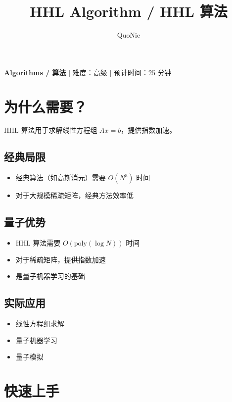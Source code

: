 \documentclass[12pt,a4paper]{article}
\title{HHL Algorithm / HHL 算法}
\author{QuoNic}
\date{}
\begin{document}
\maketitle

\begin{center}
\textbf{Algorithms / 算法} | 难度：高级 | 预计时间：25 分钟
\end{center}

\tableofcontents
\newpage

\section{为什么需要？}

HHL 算法用于求解线性方程组 $Ax=b$，提供指数加速。

\subsection{经典局限}
\begin{itemize}
  \item 经典算法（如高斯消元）需要 $O(N^3)$ 时间
  \item 对于大规模稀疏矩阵，经典方法效率低
\end{itemize}

\subsection{量子优势}
\begin{itemize}
  \item HHL 算法需要 $O(\text{poly}(\log N))$ 时间
  \item 对于稀疏矩阵，提供指数加速
  \item 是量子机器学习的基础
\end{itemize}

\subsection{实际应用}
\begin{itemize}
  \item 线性方程组求解
  \item 量子机器学习
  \item 量子模拟
\end{itemize}

\section{快速上手}
\end{document}
